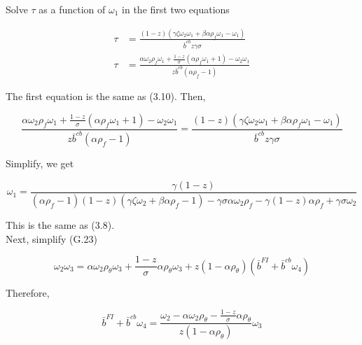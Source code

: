 \documentclass[10pt]{article}
\begin{document}
Solve $\tau$ as a function of $\omega_{1}$ in the first two equations

\begin{equation*}
\begin{aligned}
\tau & =\frac{(1-z)\left(\gamma \zeta \omega_{2} \omega_{1}+\beta \alpha \rho_{f} \omega_{1}-\omega_{1}\right)}{\bar{b}^{c b} z \gamma \sigma} \\
\tau & =\frac{\alpha \omega_{2} \rho_{f} \omega_{1}+\frac{1-z}{\sigma}\left(\alpha \rho_{f} \omega_{1}+1\right)-\omega_{2} \omega_{1}}{z \bar{b}^{c b}\left(\alpha \rho_{f}-1\right)}
\end{aligned}
\end{equation*}

The first equation is the same as (3.10). Then,

\begin{equation*}
\frac{\alpha \omega_{2} \rho_{f} \omega_{1}+\frac{1-z}{\sigma}\left(\alpha \rho_{f} \omega_{1}+1\right)-\omega_{2} \omega_{1}}{z \bar{b}^{c b}\left(\alpha \rho_{f}-1\right)}=\frac{(1-z)\left(\gamma \zeta \omega_{2} \omega_{1}+\beta \alpha \rho_{f} \omega_{1}-\omega_{1}\right)}{\bar{b}^{c b} z \gamma \sigma}
\end{equation*}

Simplify, we get

\begin{equation*}
\omega_{1}=\frac{\gamma(1-z)}{\left(\alpha \rho_{f}-1\right)(1-z)\left(\gamma \zeta \omega_{2}+\beta \alpha \rho_{f}-1\right)-\gamma \sigma \alpha \omega_{2} \rho_{f}-\gamma(1-z) \alpha \rho_{f}+\gamma \sigma \omega_{2}}
\end{equation*}

This is the same as (3.8).\\
Next, simplify (G.23)

\begin{equation*}
\omega_{2} \omega_{3}=\alpha \omega_{2} \rho_{\theta} \omega_{3}+\frac{1-z}{\sigma} \alpha \rho_{\theta} \omega_{3}+z\left(1-\alpha \rho_{\theta}\right)\left(\bar{b}^{F I}+\bar{b}^{c b} \omega_{4}\right)
\end{equation*}

Therefore,

\begin{equation*}
\bar{b}^{F I}+\bar{b}^{c b} \omega_{4}=\frac{\omega_{2}-\alpha \omega_{2} \rho_{\theta}-\frac{1-z}{\sigma} \alpha \rho_{\theta}}{z\left(1-\alpha \rho_{\theta}\right)} \omega_{3} \tag{G.24}
\end{equation*}
\end{document}
